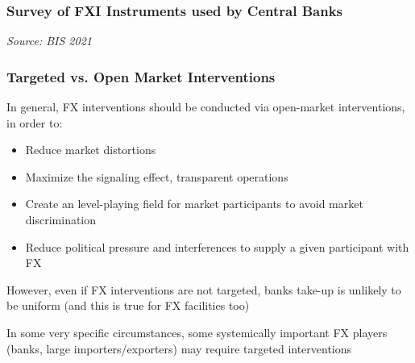 \documentclass{beamer}
\newenvironment{wideitemize}{\itemize\addtolength{\itemsep}{10pt}}{\enditemize}
\begin{document}
\begin{frame}
\frametitle{Survey of FXI Instruments used by Central Banks}
\medskip
\emph{Source: BIS 2021 \href{https://www.bis.org/publ/bppdf/bispap104b_rh.pdf)}{}}
\end{frame}


\begin{frame}
  \frametitle{Targeted vs. Open Market Interventions}
  \begin{wideitemize}
    \item In general, FX interventions should be conducted via open-market interventions, in order to:
      \begin{itemize}
      \item Reduce market distortions
      \item Maximize the signaling effect, transparent operations
      \item Create an level-playing field for market participants to avoid market discrimination
      \item Reduce political pressure and interferences to supply a given participant with FX
      \end{itemize}
    \item However, even if FX interventions are not targeted, banks take-up is unlikely to be uniform (and this is true for FX facilities too)
    \item In some very specific circumstances, some systemically important FX players (banks, large importers/exporters) may require targeted interventions
  \end{wideitemize}
\end{frame}
\end{document}
